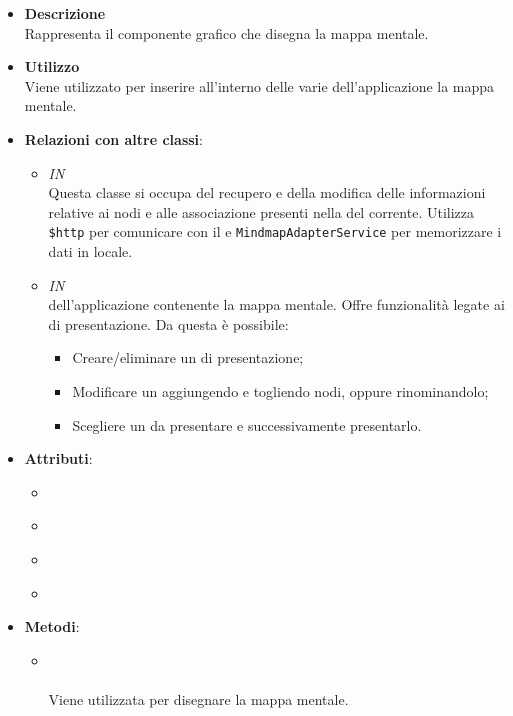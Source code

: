\begin{itemize}
\item \textbf{Descrizione}\\
Rappresenta il componente grafico che disegna la mappa mentale.
\item \textbf{Utilizzo}\\
Viene utilizzato per inserire all'interno delle varie  dell'applicazione la mappa mentale.
\item \textbf{Relazioni con altre classi}:
\begin{itemize}
\item \textit{IN} \hyperref[\nogloxy{Premi::Front-End::Services::MindmapService}]{}\\
Questa classe si occupa del recupero e della modifica delle informazioni relative ai nodi e alle associazione presenti nella  del  corrente. Utilizza \texttt{\$http} per comunicare con il  e \texttt{MindmapAdapterService} per memorizzare i dati in locale.
\item \textit{IN} \hyperref[\nogloxy{Premi::Front-End::Views::PathsEditorView}]{}\\
 dell’applicazione contenente la mappa mentale. Offre funzionalità legate ai  di presentazione.
Da questa  è possibile:
\begin{itemize}
\item Creare/eliminare un  di presentazione;
\item Modificare un  aggiungendo e togliendo nodi, oppure rinominandolo;
\item Scegliere un  da presentare e successivamente presentarlo.
\end{itemize}
\end{itemize}
\item \textbf{Attributi}:
\begin{itemize}
\item {}
\\ \dpReplace
\item {}
\\ \dpRestrict
\item {}
\\ \dpIsolatedScope
\item {}
\\ \dpTemplateUrl
\end{itemize}
\item \textbf{Metodi}:
\begin{itemize}
\item {}
\\ \dpLinkFn \\ Viene utilizzata per disegnare la mappa mentale.
\end{itemize}
\end{itemize}

